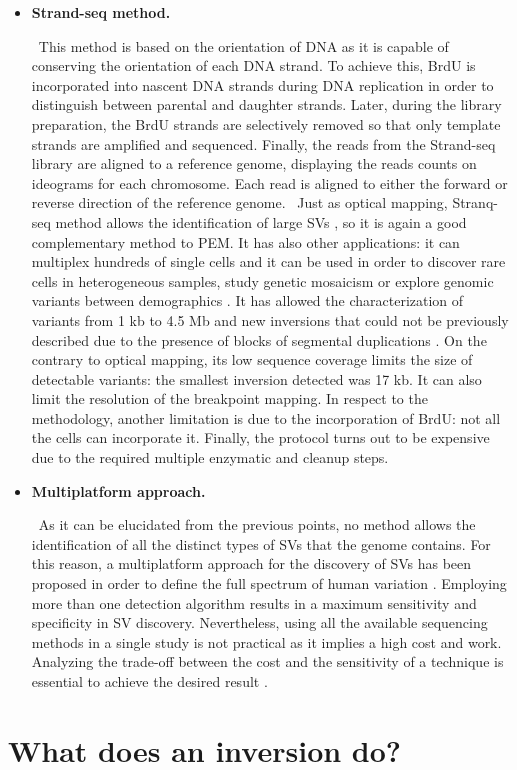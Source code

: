 \documentclass{article}
\begin{document}
\begin{itemize}
\item {\bf Strand-seq method.}

\
This method is based on the orientation of DNA as it is capable of conserving the orientation of each DNA strand. To achieve this, BrdU is incorporated into nascent DNA strands during DNA replication in order to distinguish between parental and daughter strands. Later, during the library preparation, the BrdU strands are selectively removed so that only template strands are amplified and sequenced. Finally, the reads from the Strand-seq library are aligned to a reference genome, displaying the reads counts on ideograms for each chromosome. Each read is aligned to either the forward or reverse direction of the reference genome.  
\
Just as optical mapping, Stranq-seq method allows the identification of large SVs \cite{sanders_characterizing_2016}, so it is again a good complementary method to PEM. It has also other applications: it can multiplex hundreds of single cells and it can be used in order to discover rare cells in heterogeneous samples, study genetic mosaicism or explore genomic variants between demographics \cite{sanders_characterizing_2016}. It has allowed the characterization of variants from 1 kb to 4.5 Mb and new inversions that could not be previously described due to the presence of blocks of segmental duplications \cite{sanders_characterizing_2016}. On the contrary to optical mapping, its low sequence coverage limits the size of detectable variants: the smallest inversion detected was 17 kb. It can also limit the resolution of the breakpoint mapping. In respect to the methodology, another limitation is due to the incorporation of BrdU: not all the cells can incorporate it. Finally, the protocol turns out to be expensive due to the required multiple enzymatic and cleanup steps.

\item {\bf Multiplatform approach.} 

\
As it can be elucidated from the previous points, no method allows the identification of all the distinct types of SVs that the genome contains. For this reason, a multiplatform approach for the discovery of SVs has been proposed in order to define the full spectrum of human variation \cite{chaisson_multi-platform_2019}. Employing more than one detection algorithm results in a maximum sensitivity and specificity in SV discovery. Nevertheless, using all the available sequencing methods in a single study is not practical as it implies a high cost and work. Analyzing the trade-off between the cost and the sensitivity of a technique is essential to achieve the desired result \cite{chaisson_multi-platform_2019}. 
\end{itemize}
\section{What does an inversion do?}

\newpage


\end{document}
